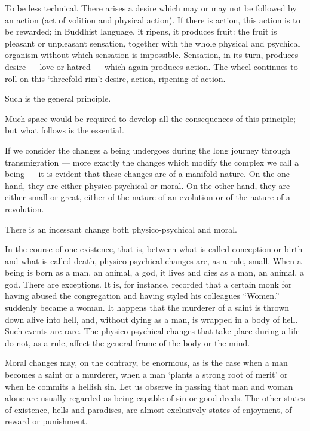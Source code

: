 \documentclass[a4paper, 11pt, oneside, english, landscape]{article}
\begin{document}
To be less technical. There arises a desire which may or may not be followed by an action (act of volition and physical action). If there is action, this action is to be rewarded; in Buddhist language, it ripens, it produces fruit: the fruit is pleasant or unpleasant sensation, together with the whole physical and psychical organism without which sensation is impossible. Sensation, in its turn, produces desire --- love or hatred --- which again produces action. The wheel continues to roll on this `threefold rim': desire, action, ripening of action.

Such is the general principle.

Much space would be required to develop all the consequences of this principle; but what follows is the essential.

If we consider the changes a being undergoes during the long journey through transmigration --- more exactly the changes which modify the complex we call a being --- it is evident that these changes are of a manifold nature. On the one hand, they are either physico-psychical or moral. On the other hand, they are either small or great, either of the nature of an evolution or of the nature of a revolution.

There is an incessant change both physico-psychical and moral.

In the course of one existence, that is, between what is called conception or birth and what is called death, physico-psychical changes are, as a rule, small. When a being is born as a man, an animal, a god, it lives and dies as a man, an animal, a god. There are exceptions. It is, for instance, recorded that a certain monk for having abused the congregation and having styled his colleagues ``Women.'' suddenly became a woman. It happens that the murderer of a saint is thrown down alive into hell, and, without dying as a man, is wrapped in a body of hell. Such events are rare. The physico-psychical changes that take place during a life do not, as a rule, affect the general frame of the body or the mind.

Moral changes may, on the contrary, be enormous, as is the case when a man becomes a saint or a murderer, when a man `plants a strong root of merit' or when he commits a hellish sin. Let us observe in passing that man and woman alone are usually regarded as being capable of sin or good deeds. The other states of existence, hells and paradises, are almost exclusively states of enjoyment, of reward or punishment.
\end{document}

